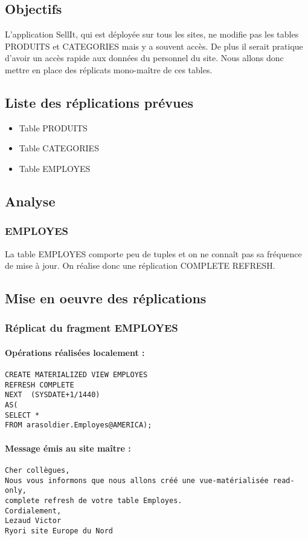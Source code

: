 \documentclass[10pt,a4paper,twoside]{article}
\begin{document}
\subsection{Objectifs}
L'application SellIt, qui est déployée sur tous les sites, ne modifie pas les tables PRODUITS et CATEGORIES mais y a souvent accès. De plus il serait pratique d'avoir un accès rapide aux données du personnel du site. Nous allons donc mettre en place des réplicats mono-maître de ces tables.
\subsection{Liste des réplications prévues}
\begin{itemize}
\item Table PRODUITS
\item Table CATEGORIES
\item Table EMPLOYES
\end{itemize}
\subsection{Analyse}
\subsubsection{EMPLOYES}
La table EMPLOYES comporte peu de tuples et on ne connaît pas sa fréquence de mise à jour. On réalise donc une réplication COMPLETE REFRESH.
\subsection{Mise en oeuvre des réplications}
\subsubsection{Réplicat du fragment EMPLOYES}
\paragraph{Opérations réalisées localement :}
\begin{verbatim}
CREATE MATERIALIZED VIEW EMPLOYES 
REFRESH COMPLETE
NEXT  (SYSDATE+1/1440)
AS(
SELECT * 
FROM arasoldier.Employes@AMERICA);
\end{verbatim}
\paragraph{Message émis au site maître :}
\begin{verbatim}
Cher collègues, 
Nous vous informons que nous allons créé une vue-matérialisée read-only, 
complete refresh de votre table Employes. 
Cordialement, 
Lezaud Victor
Ryori site Europe du Nord
\end{verbatim}
\end{document}
